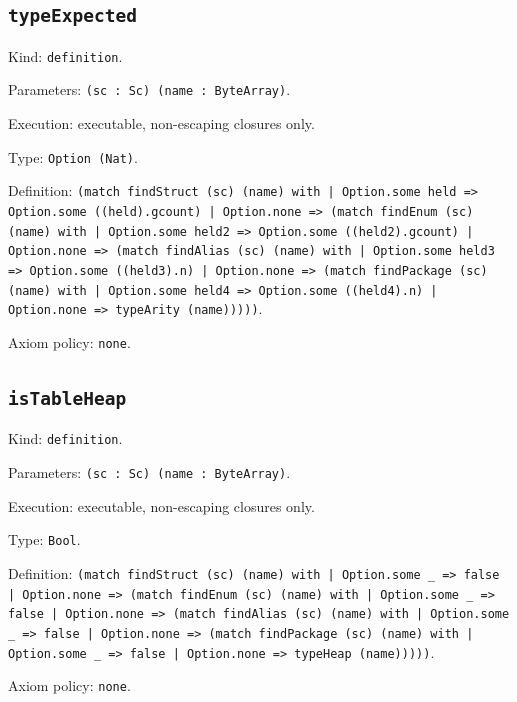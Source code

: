 \documentclass[11pt]{article}
\begin{document}
\subsection*{\texttt{typeExpected}}
\noindent Kind: \texttt{definition}.\par
\noindent Parameters: \texttt{(sc : Sc) (name : ByteArray)}.\par
\noindent Execution: executable, non-escaping closures only.\par
\noindent Type: \texttt{Option (Nat)}.\par
\noindent Definition: \texttt{(match findStruct (sc) (name) with | Option.some held => Option.some ((held).gcount) | Option.none => (match findEnum (sc) (name) with | Option.some held2 => Option.some ((held2).gcount) | Option.none => (match findAlias (sc) (name) with | Option.some held3 => Option.some ((held3).n) | Option.none => (match findPackage (sc) (name) with | Option.some held4 => Option.some ((held4).n) | Option.none => typeArity (name)))))}.\par
\noindent Axiom policy: \texttt{none}.\par
\subsection*{\texttt{isTableHeap}}
\noindent Kind: \texttt{definition}.\par
\noindent Parameters: \texttt{(sc : Sc) (name : ByteArray)}.\par
\noindent Execution: executable, non-escaping closures only.\par
\noindent Type: \texttt{Bool}.\par
\noindent Definition: \texttt{(match findStruct (sc) (name) with | Option.some \_ => false | Option.none => (match findEnum (sc) (name) with | Option.some \_ => false | Option.none => (match findAlias (sc) (name) with | Option.some \_ => false | Option.none => (match findPackage (sc) (name) with | Option.some \_ => false | Option.none => typeHeap (name)))))}.\par
\noindent Axiom policy: \texttt{none}.\par
\end{document}
